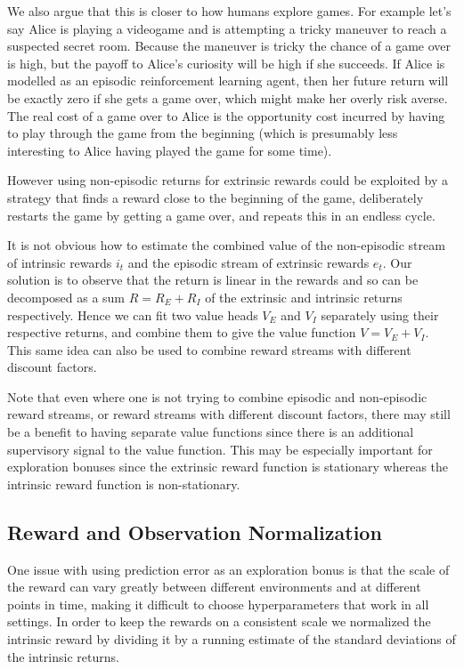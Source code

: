 \documentclass{article} \usepackage[dvipsnames]{xcolor}
\begin{document}
We also argue that this is closer to how humans explore games. For example let's say Alice is playing a videogame and is attempting a tricky maneuver to reach a suspected secret room. Because the maneuver is tricky the chance of a game over is high, but the payoff to Alice's curiosity will be high if she succeeds. If Alice is modelled as an episodic reinforcement learning agent, then her future return will be exactly zero if she gets a game over, which might make her overly risk averse. The real cost of a game over to Alice is the opportunity cost incurred by having to play through the game from the beginning (which is presumably less interesting to Alice having played the game for some time).

However using non-episodic returns for extrinsic rewards could be exploited by a strategy that finds a reward close to the beginning of the game, deliberately restarts the game by getting a game over, and repeats this in an endless cycle.

It is not obvious how to estimate the combined value of the non-episodic stream of intrinsic rewards $i_t$ and the episodic stream of extrinsic rewards $e_t$. Our solution is to observe that the return is linear in the rewards and so can be decomposed as a sum $R = R_E + R_I$ of the extrinsic and intrinsic returns respectively. Hence we can fit two value heads $V_E$ and $V_I$ separately using their respective returns, and combine them to give the value function $V = V_E + V_I$. This same idea can also be used to combine reward streams with different discount factors.

Note that even where one is not trying to combine episodic and non-episodic reward streams, or reward streams with different discount factors, there may still be a benefit to having separate value functions since there is an additional supervisory signal to the value function. This may be especially important for exploration bonuses since the extrinsic reward function is stationary whereas the intrinsic reward function is non-stationary.

\subsection{Reward and Observation Normalization}
One issue with using prediction error as an exploration bonus is that the scale of the reward can vary greatly between different environments and at different points in time, making it difficult to choose hyperparameters that work in all settings. In order to keep the rewards on a consistent scale we normalized the intrinsic reward by dividing it by a running estimate of the standard deviations of the intrinsic returns.
\end{document}
